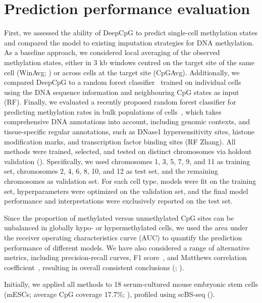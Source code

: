 \section{Prediction performance evaluation} \label{sec:dcpg_eval}

First, we assessed the ability of DeepCpG to predict single-cell methylation states and compared the model to existing imputation strategies for DNA methylation. As a baseline approach, we considered local averaging of the observed methylation states, either in 3 kb windows centred on the target site of the same cell (WinAvg; ) or across cells at the target site (CpGAvg). Additionally, we compared DeepCpG to a random forest classifier~\citep{breiman_random_2001} trained on individual cells using the DNA sequence information and neighbouring CpG states as input (RF). Finally, we evaluated a recently proposed random forest classifier for predicting methylation rates in bulk populations of cells~\citep{zhang_predicting_2015}, which takes comprehensive DNA annotations into account, including genomic contexts, and tissue-specific regular annotations, such as DNase1 hypersensitivity sites, histone modification marks, and transcription factor binding sites (RF Zhang). All methods were trained, selected, and tested on distinct chromosomes via holdout validation (). Specifically, we used chromosomes 1, 3, 5, 7, 9, and 11 as training set, chromosomes 2, 4, 6, 8, 10, and 12 as test set, and the remaining chromosomes as validation set. For each cell type, models were fit on the training set, hyperparameters were optimized on the validation set, and the final model performance and interpretations were exclusively reported on the test set.

Since the proportion of methylated versus unmethylated CpG sites can be unbalanced in globally hypo- or hypermethylated cells, we used the area under the receiver operating characteristics curve (AUC) to quantify the prediction performance of different models. We have also considered a range of alternative metrics, including precision-recall curves, F1 score~\citep{powers_evaluation:_2011}, and Matthews correlation coefficient~\citep{matthews_comparison_1975}, resulting in overall consistent conclusions (; ).

Initially, we applied all methods to 18 serum-cultured mouse embryonic stem cells (mESCs; average CpG coverage 17.7\%; ), profiled using scBS-seq ().

